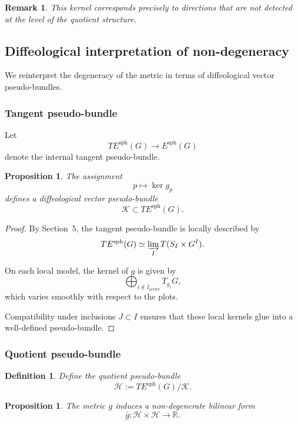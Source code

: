 \documentclass[11pt]{amsart}
\newtheorem{proposition}[theorem]{Proposition}
\newtheorem{definition}[theorem]{Definition}
\newtheorem{remark}[theorem]{Remark}
\begin{document}
\begin{remark}
This kernel corresponds precisely to directions that are not detected at the level of the quotient structure.
\end{remark}
\subsection{Diffeological interpretation of non-degeneracy}

We reinterpret the degeneracy of the metric in terms of diffeological vector pseudo-bundles.

\subsubsection{Tangent pseudo-bundle}

Let
\[
T E^{\mathrm{sph}}(G) \longrightarrow E^{\mathrm{sph}}(G)
\]
denote the internal tangent pseudo-bundle.

\begin{proposition}
The assignment
\[
p \longmapsto \ker g_p
\]
defines a diffeological vector pseudo-bundle
\[
\mathcal{K} \subset T E^{\mathrm{sph}}(G).
\]
\end{proposition}

\begin{proof}
By Section~5, the tangent pseudo-bundle is locally described by
\[
T E^{\mathrm{sph}}(G) \simeq \varinjlim_I T(S_I \times G^I).
\]

On each local model, the kernel of $g$ is given by
\[
\bigoplus_{i \notin I_{\mathrm{active}}} T_{g_i}G,
\]
which varies smoothly with respect to the plots.

Compatibility under inclusions $J \subset I$ ensures that these local kernels glue into a well-defined pseudo-bundle.
\end{proof}

\subsubsection{Quotient pseudo-bundle}

\begin{definition}
Define the quotient pseudo-bundle
\[
\mathcal{H}
:=
T E^{\mathrm{sph}}(G) / \mathcal{K}.
\]
\end{definition}

\begin{proposition}
The metric $g$ induces a non-degenerate bilinear form
\[
\bar g : \mathcal{H} \times \mathcal{H} \longrightarrow \mathbb{R}.
\]
\end{proposition}
\end{document}
